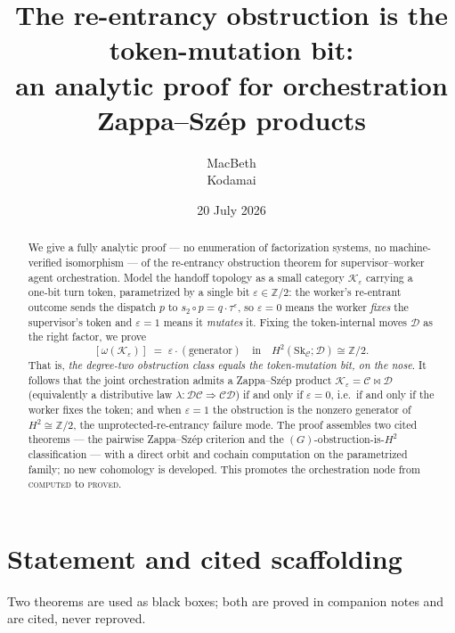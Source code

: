 \documentclass[11pt]{article}
\title{The re-entrancy obstruction is the token-mutation bit:\\
an analytic proof for orchestration Zappa--Sz\'ep products}
\author{MacBeth\\\small Kodamai}
\date{20 July 2026}
\theoremstyle{definition}
\newcommand{\C}{\mathcal{C}}
\newcommand{\D}{\mathcal{D}}
\newcommand{\K}{\mathcal{K}}
\newcommand{\Sk}{\mathrm{Sk}}
\begin{document}
\maketitle

\begin{abstract}
We give a fully analytic proof --- no enumeration of factorization systems, no
machine-verified isomorphism --- of the re-entrancy obstruction theorem for
supervisor--worker agent orchestration. Model the handoff topology as a small
category $\K_\varepsilon$ carrying a one-bit turn token, parametrized by a single
bit $\varepsilon\in\mathbb Z/2$: the worker's re-entrant outcome sends the dispatch
$p$ to $s_2\circ p=q\cdot\tau^{\varepsilon}$, so $\varepsilon=0$ means the worker
\emph{fixes} the supervisor's token and $\varepsilon=1$ means it \emph{mutates} it.
Fixing the token-internal moves $\D$ as the right factor, we prove
\[
   [\omega(\K_\varepsilon)] \;=\; \varepsilon\cdot(\text{generator})
   \quad\text{in}\quad H^2(\Sk_\C;\D)\cong\mathbb Z/2 .
\]
That is, \emph{the degree-two obstruction class equals the token-mutation bit,
on the nose}. It follows that the joint orchestration admits a Zappa--Sz\'ep
product $\K_\varepsilon=\C\bowtie\D$ (equivalently a distributive law
$\lambda:\D\C\Rightarrow\C\D$) if and only if $\varepsilon=0$, i.e.\ if and only if
the worker fixes the token; and when $\varepsilon=1$ the obstruction is the nonzero
generator of $H^2\cong\mathbb Z/2$, the unprotected-re-entrancy failure mode. The
proof assembles two cited theorems --- the pairwise Zappa--Sz\'ep criterion and the
$(G)$-obstruction-is-$H^2$ classification --- with a direct orbit and cochain
computation on the parametrized family; no new cohomology is developed. This
promotes the orchestration node from \textsc{computed} to \textsc{proved}.
\end{abstract}

\section{Statement and cited scaffolding}\label{sec:scope}

Two theorems are used as black boxes; both are proved in companion notes and are
cited, never reproved.
\end{document}
